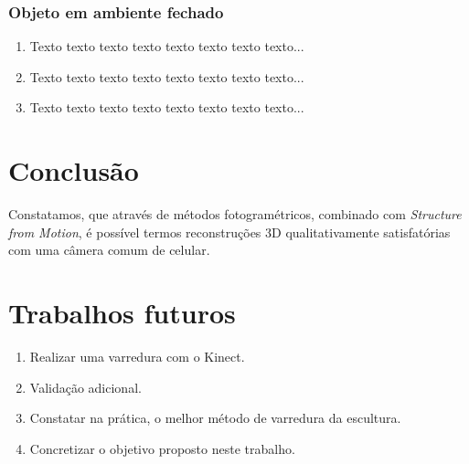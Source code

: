 \documentclass[table, usenames, svgnames, xcolor=dvipsnames]{beamer}
\begin{document}
\subsubsection{Objeto em ambiente fechado}

\begin{frame}
	\begin{enumerate}
    	\item Texto texto texto texto texto texto texto texto...
		\\[0.5em]

    	\item Texto texto texto texto texto texto texto texto...
		\\[0.5em]
    	
		\item Texto texto texto texto texto texto texto texto...
		\\[0.5em]
	\end{enumerate}
\end{frame}


\section{Conclusão}

\begin{frame}
	\begin{center}
	Constatamos, que através de métodos fotogramétricos, combinado com \emph{Structure from Motion}, é possível termos reconstruções 3D qualitativamente satisfatórias com uma câmera comum de celular.
	\end{center}

\end{frame}

\section{Trabalhos futuros}

\begin{frame}
	\begin{enumerate}
    	\item {Realizar uma varredura com o Kinect.}
 \item {Validação adicional.} 
\item {Constatar na prática, o melhor método de varredura da escultura.} 
\item {Concretizar o objetivo proposto neste trabalho.}
	\end{enumerate}
\end{frame}
\end{document}
